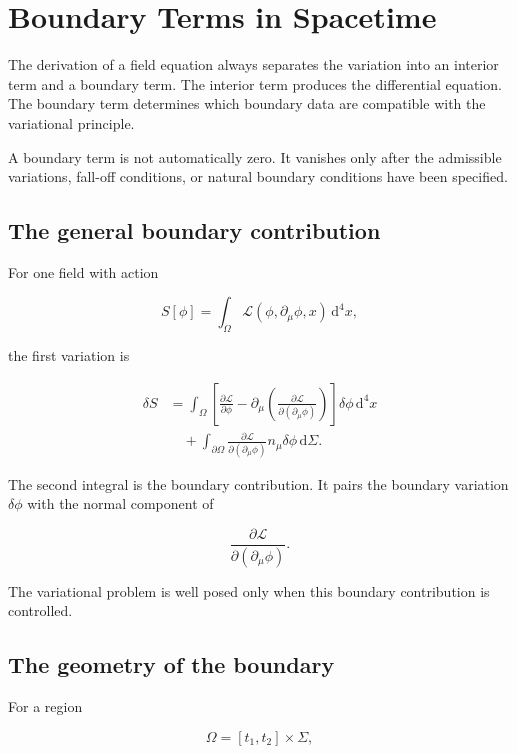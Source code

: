 \section{Boundary Terms in Spacetime}
\label{sec:boundary_terms_in_spacetime}

The derivation of a field equation always separates the variation into an interior term and a boundary term. The interior term produces the differential equation. The boundary term determines which boundary data are compatible with the variational principle.

A boundary term is not automatically zero. It vanishes only after the admissible variations, fall-off conditions, or natural boundary conditions have been specified.

\subsection{The general boundary contribution}

For one field with action

\[
S[\phi]
=
\int_{\Omega}
\mathcal{L}(\phi,\partial_{\mu}\phi,x)
\,\mathrm{d}^{4}x,
\]

the first variation is

\[
\begin{aligned}
\delta S
&=
\int_{\Omega}
\left[
\frac{\partial\mathcal{L}}{\partial\phi}
-
\partial_{\mu}
\left(
\frac{\partial\mathcal{L}}
{\partial(\partial_{\mu}\phi)}
\right)
\right]
\delta\phi
\,\mathrm{d}^{4}x\\
&\quad+
\int_{\partial\Omega}
\frac{\partial\mathcal{L}}
{\partial(\partial_{\mu}\phi)}
n_{\mu}\delta\phi
\,\mathrm{d}\Sigma.
\end{aligned}
\]

The second integral is the boundary contribution. It pairs the boundary variation \(\delta\phi\) with the normal component of

\[
\frac{\partial\mathcal{L}}
{\partial(\partial_{\mu}\phi)}.
\]

The variational problem is well posed only when this boundary contribution is controlled.

\subsection{The geometry of the boundary}

For a region

\[
\Omega=[t_{1},t_{2}]\times\Sigma,
\]

